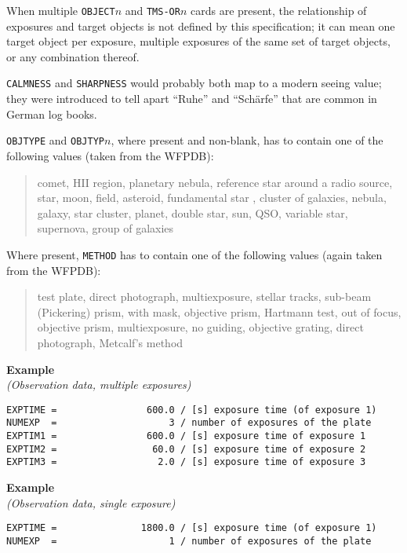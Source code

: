 \documentclass[11pt]{ivoa}
\newcommand\cardname[1]{\texttt{\color{keyword}#1}}
\newenvironment{fitsexample}[1]
{\bigskip\noindent\textbf{Example}\\\textit{(#1)\smallskip}}
{\medskip}
\begin{document}
When multiple \cardname{OBJECT$n$} and \cardname{TMS-OR$n$} cards are
present, the relationship of exposures and target objects is not defined
by this specification; it can mean one target object per exposure,
multiple exposures of the same set of target objects, or any combination
thereof.

\cardname{CALMNESS} and \cardname{SHARPNESS} would probably both map to
a modern seeing value; they were introduced to tell apart ``Ruhe'' and
``Schärfe'' that are common in German log books.

\cardname{OBJTYPE} and \cardname{OBJTYP$n$}, where present and
non-blank, has to contain one of the following values (taken from the
WFPDB):

\begin{quotation}
\noindent comet, HII region, planetary nebula, reference star around a radio
source, star, moon, field, asteroid, fundamental star
, cluster of galaxies, nebula, galaxy, star cluster, planet, double
star, sun, QSO, variable star, supernova, group of galaxies
\end{quotation}

Where present, \cardname{METHOD} has to contain one of the following
values (again taken from the WFPDB):

\begin{quotation}
\noindent test plate, direct photograph, multiexposure, stellar tracks, sub-beam
(Pickering) prism, with mask, objective prism, Hartmann test, out of
focus, objective prism, multiexposure, no guiding, objective grating,
direct photograph, Metcalf's method
\end{quotation}

\begin{fitsexample}{Observation data, multiple exposures}
\begin{lstlisting}
EXPTIME =                600.0 / [s] exposure time (of exposure 1)
NUMEXP  =                    3 / number of exposures of the plate
EXPTIM1 =                600.0 / [s] exposure time of exposure 1
EXPTIM2 =                 60.0 / [s] exposure time of exposure 2
EXPTIM3 =                  2.0 / [s] exposure time of exposure 3
\end{lstlisting}
\end{fitsexample}

\begin{fitsexample}{Observation data, single exposure}
\begin{lstlisting}
EXPTIME =               1800.0 / [s] exposure time (of exposure 1)
NUMEXP  =                    1 / number of exposures of the plate
\end{lstlisting}
\end{fitsexample}
\end{document}
